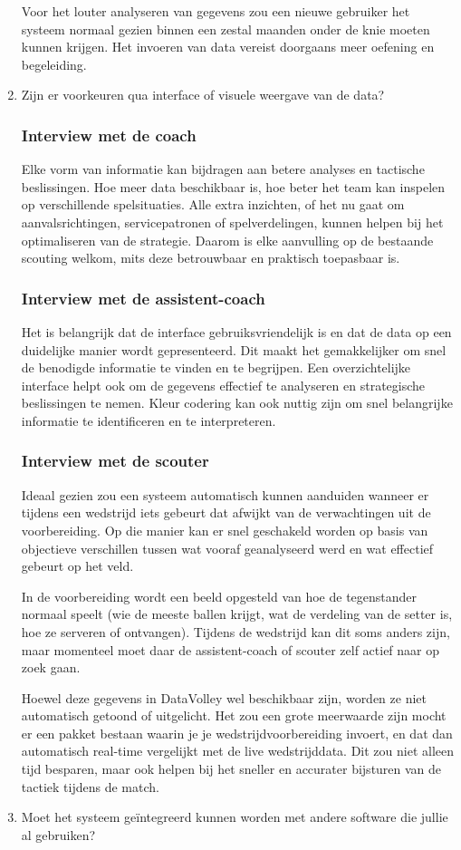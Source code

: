 \begin{enumerate}
  Voor het louter analyseren van gegevens zou een nieuwe gebruiker het systeem normaal gezien binnen een zestal maanden onder de knie moeten kunnen krijgen. Het invoeren van data vereist doorgaans meer oefening en begeleiding.
  \item Zijn er voorkeuren qua interface of visuele weergave van de data?
  \subsubsection{Interview met de coach}
  Elke vorm van informatie kan bijdragen aan betere analyses en tactische beslissingen. Hoe meer data beschikbaar is, hoe beter het team kan inspelen op verschillende spelsituaties. Alle extra inzichten, of het nu gaat om aanvalsrichtingen, servicepatronen of spelverdelingen, kunnen helpen bij het optimaliseren van de strategie. Daarom is elke aanvulling op de bestaande scouting welkom, mits deze betrouwbaar en praktisch toepasbaar is.
  \subsubsection{Interview met de assistent-coach}
  Het is belangrijk dat de interface gebruiksvriendelijk is en dat de data op een duidelijke manier wordt gepresenteerd. Dit maakt het gemakkelijker om snel de benodigde informatie te vinden en te begrijpen. Een overzichtelijke interface helpt ook om de gegevens effectief te analyseren en strategische beslissingen te nemen. Kleur codering kan ook nuttig zijn om snel belangrijke informatie te identificeren en te interpreteren.
  \subsubsection{Interview met de scouter}
  Ideaal gezien zou een systeem automatisch kunnen aanduiden wanneer er tijdens een wedstrijd iets gebeurt dat afwijkt van de verwachtingen uit de voorbereiding. Op die manier kan er snel geschakeld worden op basis van objectieve verschillen tussen wat vooraf geanalyseerd werd en wat effectief gebeurt op het veld.

  In de voorbereiding wordt een beeld opgesteld van hoe de tegenstander normaal speelt (wie de meeste ballen krijgt, wat de verdeling van de setter is, hoe ze serveren of ontvangen). Tijdens de wedstrijd kan dit soms anders zijn, maar momenteel moet daar de assistent-coach of scouter zelf actief naar op zoek gaan.

  Hoewel deze gegevens in DataVolley wel beschikbaar zijn, worden ze niet automatisch getoond of uitgelicht. Het zou een grote meerwaarde zijn mocht er een pakket bestaan waarin je je wedstrijdvoorbereiding invoert, en dat dan automatisch real-time vergelijkt met de live wedstrijddata. Dit zou niet alleen tijd besparen, maar ook helpen bij het sneller en accurater bijsturen van de tactiek tijdens de match.
  \item Moet het systeem geïntegreerd kunnen worden met andere software die jullie al gebruiken?

\end{enumerate}
